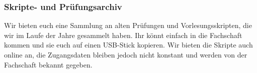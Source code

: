 \subsubsection{Skripte- und Prüfungsarchiv}
Wir bieten euch eine Sammlung an alten Prüfungen und Vorlesungsskripten, die wir im Laufe der Jahre gesammelt haben. \doublebreak
Ihr könnt einfach in die Fachschaft kommen und sie euch auf einen USB-Stick kopieren. Wir bieten die Skripte auch online an, die Zugangsdaten bleiben jedoch nicht konstant und werden von der Fachschaft bekannt 
gegeben. 